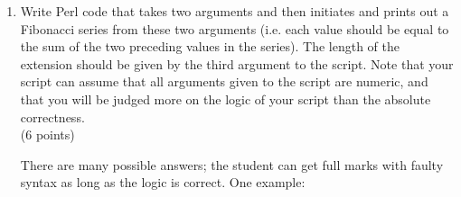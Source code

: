 \documentclass[11pt]{article}
\begin{document}
\begin{enumerate}
\item Write Perl code that takes two arguments and then initiates and prints out a Fibonacci
  series from these two arguments (i.e. each value should be equal to the sum of the
  two preceding values in the series). The length of the extension should be given
  by the third argument to the script. Note that your script can assume that
  all arguments given to the script are numeric, and that you will be judged
  more on the logic of your script than the absolute correctness.\\
  (6 points)

\begin{Notes}
  There are many possible answers; the student can get full marks with faulty
  syntax as long as the logic is correct. One example:

\end{Notes}

\end{enumerate}
\end{document}
